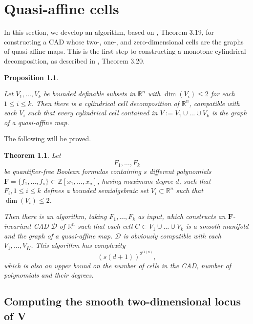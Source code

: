 \documentclass[
]{book}
\newtheorem{theorem}{Theorem}[chapter]
\newtheorem{proposition}{Proposition}[chapter]
\theoremstyle{definition}
\theoremstyle{definition}
\theoremstyle{definition}
\theoremstyle{definition}
\theoremstyle{remark}
\begin{document}
\hypertarget{sec:quasi-affine}{%
\chapter{Quasi-affine cells}\label{sec:quasi-affine}}

In this section, we develop an algorithm, based on \citet{bgv15}, Theorem 3.19, for constructing a CAD whose two-, one-, and zero-dimensional cells are the graphs of quasi-affine maps. This is the first step to constructing a monotone cylindrical decomposition, as described in \citet{bgv15}, Theorem 3.20.

\begin{proposition}
\protect\hypertarget{prp:bgv-quasi}{}\label{prp:bgv-quasi}\citep[Theorem 3.19]{bgv15}

Let \(V_1,\ldots,V_k\) be bounded deﬁnable subsets in \(\mathbb{R}^n\) with \(\dim (V_i) \le 2\) for each
\(1 \le i \le k\).
Then there is a cylindrical cell decomposition of \(\mathbb{R}^n\), compatible with each \(V_i\) such that every cylindrical cell contained in \(V := V_1\cup\ldots\cup V_k\) is the graph of a quasi-affine map.
\end{proposition}

The following will be proved.

\begin{theorem}
\protect\hypertarget{thm:bgv-quasi-algorithm}{}\label{thm:bgv-quasi-algorithm}Let
\[
F_1,\ldots,F_k
\]
be quantifier-free Boolean formulas containing \(s\) different polynomials \(\mathbf{F} = \{ f_1,\ldots, f_s \} \subset \mathbb{Z}[x_1,\ldots,x_n]\), having maximum degree \(d\), such that \(F_i, 1\le i \le k\) defines a bounded semialgebraic set \(V_i \subset \mathbb{R}^n\) such that \(\dim(V_i) \le 2\).

Then there is an algorithm, taking \(F_1,\ldots,F_k\) as input, which constructs an \(\mathbf{F}\)-invariant CAD \(\mathcal{D}\) of \(\mathbb{R}^n\) such that each cell \(C \subset V_1\cup\ldots\cup V_k\) is a smooth manifold and the graph of a quasi-affine map. \(\mathcal{D}\) is obviously compatible with each \(V_1,\ldots,V_K\).
This algorithm has complexity
\[
\left(s\left(d+1\right)\right)^{2^{O(n)}},
\]
which is also an upper bound on the number of cells in the CAD, number of polynomials and their degrees.
\end{theorem}

\hypertarget{computing-the-smooth-two-dimensional-locus-of-v}{%
\section{Computing the smooth two-dimensional locus of V}\label{computing-the-smooth-two-dimensional-locus-of-v}}
\end{document}
